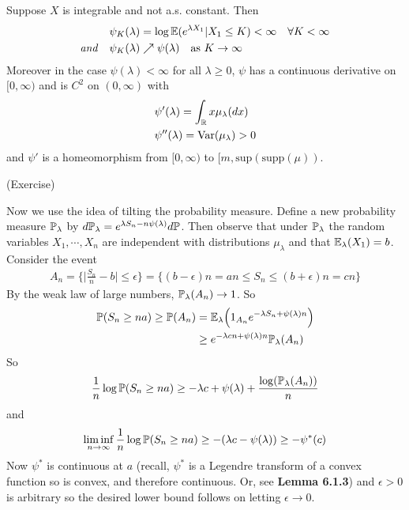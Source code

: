 \documentclass[10pt,a4paper]{report}
\newenvironment{proof}
{\begin{changemargin}{1cm}{0.5cm} 
	}%
	{\end{changemargin}
}
\newenvironment{subproof}
{\begin{changemargin}{0.5cm}{0.5cm} 
	}%
	{\end{changemargin}
}
\begin{document}
\begin{proof}
\begin{subproof}
 Suppose $X$ is integrable and not a.s. constant. Then 
\begin{align*}
& \psi_K(\lambda) = \log \mathbb{E}(e^{\lambda X_1}|X_1 \leq K) < \infty \quad \forall K < \infty \\
\text{\emph{and}} \quad & \psi_K(\lambda) \nearrow \psi(\lambda) \quad \text{as } K\rightarrow \infty
\end{align*}
Moreover in the case $\psi(\lambda) < \infty$ for all $\lambda \geq 0$, $\psi$ has a continuous derivative on $[0,\infty)$ and is $C^2$ on $(0,\infty)$ with
\begin{align*}
& \psi'(\lambda) = \int_{\mathbb{R}} x\mu_{\lambda}(dx) \\
& \psi''(\lambda) = \text{Var}(\mu_{\lambda}) > 0
\end{align*}
and $\psi'$ is a homeomorphism from $[0,\infty)$ to $[m, \text{sup}(\text{supp}(\mu))$.

\pf (Exercise)
\end{subproof}

\quad Now we use the idea of tilting the probability measure. Define a new probability measure $\mathbb{P}_{\lambda}$ by $d\mathbb{P}_{\lambda} = e^{\lambda S_n -n \psi(\lambda)} d\mathbb{P}$. Then observe that under $\mathbb{P}_{\lambda}$ the random variables $X_1, \cdots, X_n$ are independent with distributions $\mu_{\lambda}$ and that $\mathbb{E}_{\lambda}(X_1) = b$. Consider the event
\begin{align*}
A_n = \{\Big| \frac{S_n}{n} -b \Big| \leq \epsilon \} = \{ (b- \epsilon)n = an \leq S_n \leq (b + \epsilon)n =cn \}
\end{align*}
By the weak law of large numbers, $\mathbb{P}_{\lambda}(A_n ) \rightarrow 1$. So
\begin{align*}
\mathbb{P}(S_n \geq na) \geq \mathbb{P}(A_n) &= \mathbb{E}_{\lambda} \Big( 1_{A_n} e^{-\lambda S_n + \psi(\lambda)n} \Big) \\
&\geq e^{-\lambda cn + \psi(\lambda) n} \mathbb{P}_{\lambda}(A_n)
\end{align*}
So 
\begin{align*}
\frac{1}{n} \log \mathbb{P} (S_n \geq na) \geq -\lambda c + \psi(\lambda) + \frac{\log (\mathbb{P}_{\lambda} (A_n))}{n}
\end{align*}
and
\begin{align*}
\liminf_{n\rightarrow \infty} \frac{1}{n} \log \mathbb{P}(S_n \geq na) \geq -(\lambda c - \psi(\lambda)) \geq -\psi^* (c)
\end{align*}
Now $\psi^*$ is continuous at $a$ (recall, $\psi^*$ is a Legendre transform of a convex function so is convex, and therefore continuous. Or, see \textbf{Lemma 6.1.3}) and $\epsilon >0$ is arbitrary so the desired lower bound follows on letting  $\epsilon \rightarrow 0$.
\s


\end{proof}
\end{document}
